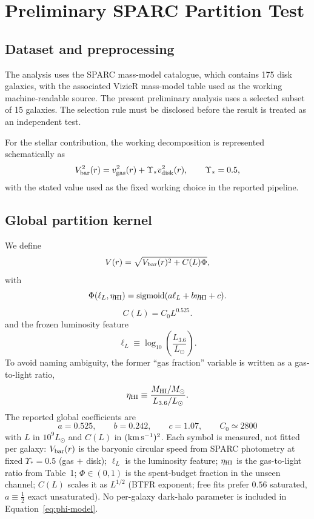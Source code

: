 \documentclass[twocolumn]{aastex631}
\begin{document}
\section{Preliminary SPARC Partition Test}
\subsection{Dataset and preprocessing}
The analysis uses the SPARC mass-model catalogue, which contains 175 disk galaxies, with the associated VizieR mass-model table used as the working machine-readable source. The present preliminary analysis uses a selected subset of 15 galaxies. The selection rule must be disclosed before the result is treated as an independent test.

For the stellar contribution, the working decomposition is represented schematically as
\[
V_{\rm bar}^2(r)=v_{\rm gas}^2(r)+\Upsilon_*v_{\rm disk}^2(r),
\qquad
\Upsilon_*=0.5,
\]
with the stated value used as the fixed working choice in the reported pipeline.

\subsection{Global partition kernel}
We define
\begin{equation}
V(r)=\sqrt{V_{\rm bar}(r)^2+C(L)\Phi},
\label{eq:phi-model}
\end{equation}
with
\begin{equation}
\Phi(\ell_L,\eta_{\rm HI})
=\operatorname{sigmoid}(a\ell_L+b\eta_{\rm HI}+c).
\end{equation}
\begin{equation}
C(L)=C_0L^{0.525}.
\end{equation}
and the frozen luminosity feature
\[
\ell_L\equiv\log_{10}\left(\frac{L_{3.6}}{L_\odot}\right).
\]
To avoid naming ambiguity, the former ``gas fraction'' variable is written as a gas-to-light ratio,
\[
\eta_{\rm HI}\equiv
\frac{M_{\rm HI}/M_\odot}{L_{3.6}/L_\odot}.
\]
The reported global coefficients are
\begin{equation}
a=0.525,\qquad b=0.242,\qquad c=1.07,
\qquad
C_0\simeq2800
\label{eq:phi-coeff}
\end{equation}
with $L$ in $10^9L_\odot$ and $C(L)$ in $({\rm km\,s^{-1}})^2$.
Each symbol is measured, not fitted per galaxy: $V_{\rm bar}(r)$ is the baryonic circular speed from SPARC photometry at fixed $\Upsilon_*=0.5$ (gas $+$ disk); $\ell_L$ is the luminosity feature; $\eta_{\rm HI}$ is the gas-to-light ratio from Table~1; $\Phi\in(0,1)$ is the spent-budget fraction in the unseen channel; $C(L)$ scales it as $L^{1/2}$ (BTFR exponent; free fits prefer $0.56$ saturated, $a\equiv\frac12$ exact unsaturated).
No per-galaxy dark-halo parameter is included in Equation~\eqref{eq:phi-model}.
\end{document}
